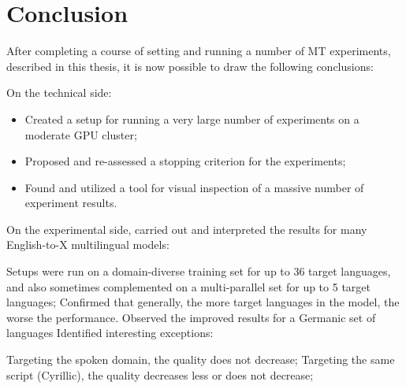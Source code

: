 \chapter*{{Conclusion}}


After completing a course of setting and running a number of MT experiments, described in this thesis, it is now possible to draw the following conclusions:

On the technical side:
\begin{itemize}
    \item Created a setup for running a very large number of experiments on a moderate GPU cluster;
    \item Proposed and re-assessed a stopping criterion for the experiments;
    \item Found and utilized a tool for visual inspection of a massive number of experiment results.
\end{itemize}

On the experimental side, carried out and interpreted the results for many English-to-X multilingual models:

\begin{outline}
\1 Setups were run on a domain-diverse training set for up to 36 target languages, and also sometimes complemented on a multi-parallel set for up to 5 target languages;
\1 Confirmed that generally, the more target languages in the model, the worse the performance.
\1 Observed the improved results for a Germanic set of languages
\1 Identified interesting exceptions:
  
  \2 Targeting the spoken domain, the quality does not decrease;
  \2 Targeting the same script (Cyrillic), the quality decreases less or does not decrease;
 

\end{outline}